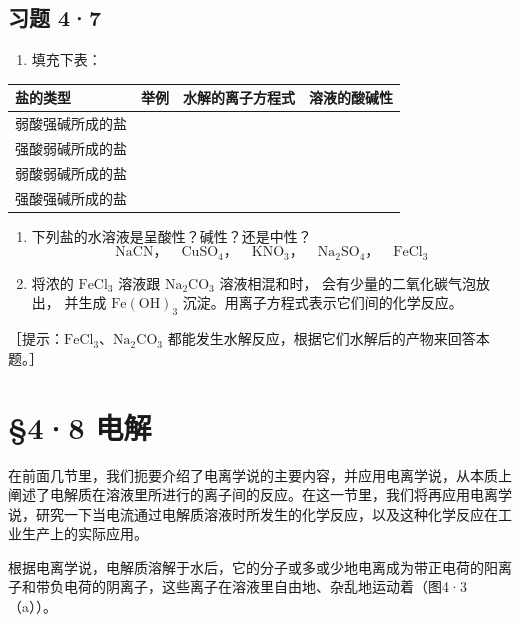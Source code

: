 \subsection{习题 4·7}

\begin{enumerate}
\item
  填充下表：
\end{enumerate}

{\def\LTcaptype{none} %
\begin{longtable}[]{@{}llll@{}}
\toprule\noalign{}
盐的类型 & 举例 & 水解的离子方程式 & 溶液的酸碱性 \\
\midrule\noalign{}
\endhead
\bottomrule\noalign{}
\endlastfoot
弱酸强碱所成的盐 & & & \\
强酸弱碱所成的盐 & & & \\
弱酸弱碱所成的盐 & & & \\
强酸强碱所成的盐 & & & \\
\end{longtable}
}

\begin{enumerate}[start=2]
\item
  下列盐的水溶液是呈酸性？碱性？还是中性？
\[
\mathrm{NaCN}\text{，} \quad \mathrm{CuSO} _ {4}\text{，} \quad \mathrm{KNO} _ {3}\text{，} \quad \mathrm{Na} _ {2} \mathrm{SO} _ {4}\text{，} \quad \mathrm{FeCl} _ {3}
\]
\item
  将浓的 \(\mathrm{FeCl}_3\) 溶液跟 \(\mathrm{Na}_2\mathrm{CO}_3\)
  溶液相混和时， 会有少量的二氧化碳气泡放出， 并生成
  \(\mathrm{Fe(OH)}_3\) 沉淀。用离子方程式表示它们间的化学反应。
\end{enumerate}

［提示：\(\mathrm{FeCl}_{3}\)、\(\mathrm{Na}_{2}\mathrm{CO}_{3}\)
都能发生水解反应，根据它们水解后的产物来回答本题。］

\section{§4·8 电解}

在前面几节里，我们扼要介绍了电离学说的主要内容，并应用电离学说，从本质上阐述了电解质在溶液里所进行的离子间的反应。在这一节里，我们将再应用电离学说，研究一下当电流通过电解质溶液时所发生的化学反应，以及这种化学反应在工业生产上的实际应用。

根据电离学说，电解质溶解于水后，它的分子或多或少地电离成为带正电荷的阳离子和带负电荷的阴离子，这些离子在溶液里自由地、杂乱地运动着（图4·3（a））。

